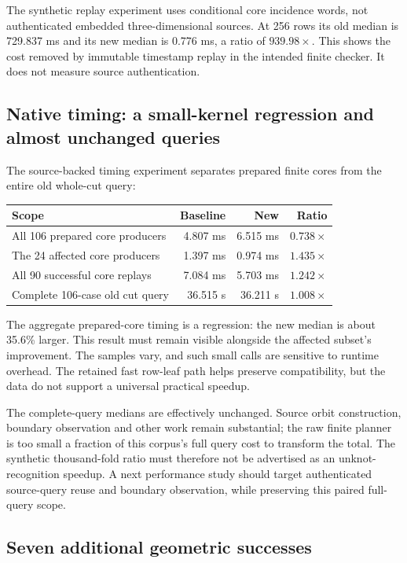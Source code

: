 The synthetic replay experiment uses conditional core incidence words,
not authenticated embedded three-dimensional sources. At 256 rows its
old median is 729.837 ms and its new median is 0.776 ms, a ratio of
$939.98\times$. This shows the cost removed by immutable timestamp replay
in the intended finite checker. It does not measure source authentication.

\subsection{Native timing: a small-kernel regression and almost unchanged queries}

The source-backed timing experiment separates prepared finite cores from
the entire old whole-cut query:
\begin{center}
\begin{tabular}{@{}p{}rrr@{}}
\toprule
Scope & Baseline & New & Ratio\\
\midrule
All 106 prepared core producers & 4.807 ms & 6.515 ms & $0.738\times$\\
The 24 affected core producers & 1.397 ms & 0.974 ms & $1.435\times$\\
All 90 successful core replays & 7.084 ms & 5.703 ms & $1.242\times$\\
Complete 106-case old cut query & 36.515 s & 36.211 s & $1.008\times$\\
\bottomrule
\end{tabular}
\end{center}

The aggregate prepared-core timing is a regression: the new median is
about 35.6\% larger. This result must remain visible alongside the affected
subset's improvement. The samples vary, and such small calls are sensitive
to runtime overhead. The retained fast row-leaf path helps preserve
compatibility, but the data do not support a universal practical speedup.

The complete-query medians are effectively unchanged. Source orbit
construction, boundary observation and other work remain substantial;
the raw finite planner is too small a fraction of this corpus's full
query cost to transform the total. The synthetic thousand-fold ratio
must therefore not be advertised as an unknot-recognition speedup.
A next performance study should target authenticated source-query reuse
and boundary observation, while preserving this paired full-query scope.

\subsection{Seven additional geometric successes}

